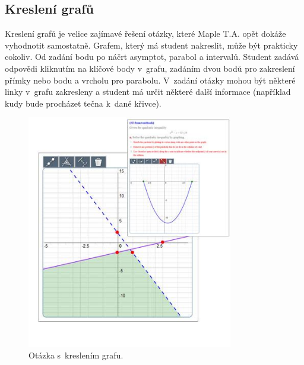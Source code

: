\documentclass[
print,
  11pt,
  table,   
  nolof,    
  nolot,
  oneside,final
]{fithesis3}
\begin{document}
	\subsection{Kreslení grafů}
Kreslení grafů je velice zajímavé řešení otázky, které Maple T.A. opět dokáže vyhodnotit samostatně. Grafem, který má student nakreslit, může být prakticky cokoliv. Od zadání bodu po náčrt asymptot, parabol a intervalů. Student zadává odpovědi kliknutím na klíčové body v~grafu, zadáním dvou bodů pro zakreslení přímky nebo bodu a vrcholu pro parabolu. V~zadání otázky mohou být některé linky v~grafu zakresleny a student má určit některé další informace (například kudy bude procházet tečna k~dané křivce). 
		\begin{figure}[hbt]
		  \begin{center}
		    \includegraphics[width=90mm]{images/MapleTA_graph.png}
		   \end{center}
		  \caption{Otázka s~kreslením grafu.  \cite{maple-question}}
		  \label{fig:maplegraph}
		\end{figure}
\end{document}
